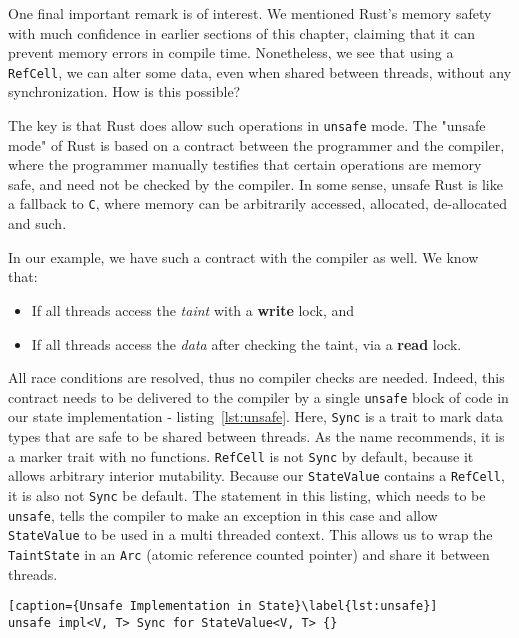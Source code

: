 One final important remark is of interest. We mentioned Rust's memory safety with much confidence in
earlier sections of this chapter, claiming that it can prevent memory errors in compile time.
Nonetheless, we see that using a \texttt{RefCell}, we can alter some data, even when shared between
threads, without any synchronization. How is this possible?

The key is that Rust does allow such operations in \texttt{unsafe} mode. The "unsafe mode" of Rust is
based on a contract between the programmer and the compiler, where the programmer manually
testifies that certain operations are memory safe, and need not be checked by the compiler. In
some sense, unsafe Rust is like a fallback to \texttt{C}, where memory can be arbitrarily accessed,
allocated, de-allocated and such.

In our example, we have such a contract with the compiler as well. We know that:

\begin{itemize}
	\item If all threads access the \textit{taint} with a \textbf{write} lock, and
	\item If all threads access the \textit{data} after checking the taint, via a \textbf{read} lock.
\end{itemize}

All race conditions are resolved, thus no compiler checks are needed. Indeed, this contract needs to
be delivered to the compiler by a single \texttt{unsafe} block of code in our state
implementation - listing~\ref{lst:unsafe}.
Here, \texttt{Sync} is a trait to mark data types that are safe to be shared between threads. As the name
recommends, it is a marker trait with no functions. \texttt{RefCell} is not \texttt{Sync} by
default, because it allows arbitrary interior mutability. Because our \texttt{StateValue} contains
a \texttt{RefCell}, it is also not \texttt{Sync} be default. The statement in this listing, which needs to be
\texttt{unsafe}, tells the compiler to make an exception in this case and allow \texttt{StateValue}
to be used in a multi threaded context. This allows us to wrap the \texttt{TaintState} in an
\texttt{Arc} (atomic reference counted pointer) and share it between threads.


\begin{lstlisting}[caption={Unsafe Implementation in State}\label{lst:unsafe}]
unsafe impl<V, T> Sync for StateValue<V, T> {}
\end{lstlisting}




